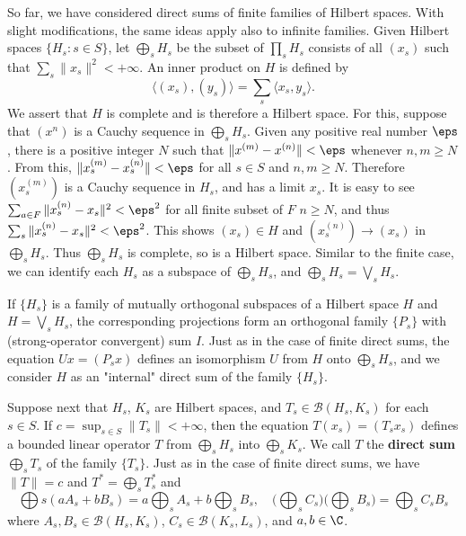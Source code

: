 So far, we have considered direct sums of finite families of Hilbert spaces. With slight modifications, the same ideas apply also to infinite families. Given Hilbert spaces $\{H_s:s\in S\}$, let $\bigoplus_sH_s$ be the subset of $\prod_sH_s$ consists of all $(x_s)$ such that $\sum_s\|x_s\|^2<+\infty$. An inner product on $H$ is defined by
\[\langle(x_s),(y_s)\rangle=\sum_s\langle x_s,y_s\rangle.\]
We assert that $H$ is complete and is therefore a Hilbert space. For this, suppose that $(x^{n})$ is a Cauchy sequence in $\bigoplus_sH_s$. Given any positive real number $\eps$, there is a positive integer $N$ such that $\|x^{(m)}-x^{(n)}\|<\eps$ whenever $n,m\geq N$. From this, $\|x^{(m)}_s-x^{(n)}_s\|<\eps$ for all $s\in S$ and $n,m\geq N$. Therefore $(x^{(m)}_s)$ is a Cauchy sequence in $H_s$, and has a limit $x_s$. It is easy to see $\sum_{a\in F}\|x_s^{(n)}-x_s\|^2<\eps^2$ for all finite subset of $F$ $n\geq N$, and thus $\sum_s\|x_s^{(n)}-x_s\|^2<\eps^2$. This shows $(x_s)\in H$ and $(x^{(n)}_s)\to(x_s)$ in $\bigoplus_sH_s$. Thus $\bigoplus_sH_s$ is complete, so is a Hilbert space. Similar to the finite case, we can identify each $H_s$ as a subspace of $\bigoplus_sH_s$, and $\bigoplus_sH_s=\bigvee_sH_s$.\par
If $\{H_s\}$ is a family of mutually orthogonal subspaces of a Hilbert space $H$ and $H=\bigvee_sH_s$, the corresponding projections form an orthogonal family $\{P_s\}$ with (strong-operator convergent) sum $I$. Just as in the case of finite direct sums, the equation $Ux=(P_sx)$ defines an isomorphism $U$ from $H$ onto $\bigoplus_sH_s$, and we consider $H$ as an "internal" direct sum of the family $\{H_s\}$.\par
Suppose next that $H_s$, $K_s$ are Hilbert spaces, and $T_s\in\mathcal{B}(H_s,K_s)$ for each $s\in S$. If $c=\sup_{s\in S}\|T_s\|<+\infty$, then the equation $T(x_s)=(T_sx_s)$ defines a bounded linear operator $T$ from $\bigoplus_sH_s$ into $\bigoplus_sK_s$. We call $T$ the \textbf{direct sum} $\bigoplus_sT_s$ of the family $\{T_s\}$. Just as in the case of finite direct sums, we have $\|T\|=c$ and $T^*=\bigoplus_sT_s^*$ and
\[\bigoplus{s}(aA_s+bB_s)=a\bigoplus_{s}A_s+b\bigoplus_{s}B_s,\quad \Big(\bigoplus_{s}C_s\Big)\Big(\bigoplus_{s}B_s\Big)=\bigoplus_{s}C_sB_s\]
where $A_s,B_s\in\mathcal{B}(H_s,K_s)$, $C_s\in\mathcal{B}(K_s,L_s)$, and $a,b\in\C$.
